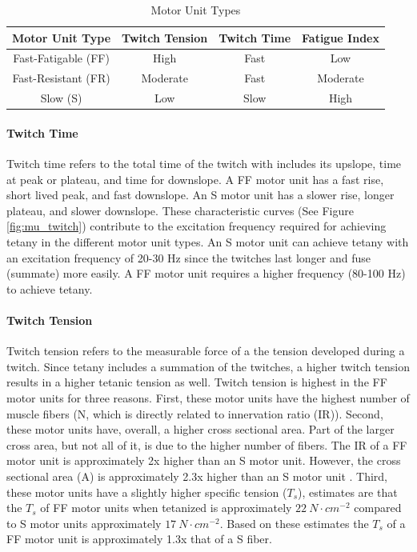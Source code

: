 \begin{table}[h!]
\centering
\begin{tabular}{||c c c c||} 
 \hline
 Motor Unit Type & Twitch Tension & Twitch Time & Fatigue Index \\ [0.5ex] 
 \hline\hline
 Fast-Fatigable (FF)  & High & Fast & Low \\ 
 Fast-Resistant (FR)  & Moderate & Fast & Moderate \\
 Slow (S) &  Low & Slow & High \\ [1ex] 
 \hline
\end{tabular}
\caption{Motor Unit Types}
\label{table:Motor_Unit_Types}
\end{table}

\paragraph{Twitch Time}
Twitch time refers to the total time of the twitch with includes its upslope, time at peak or plateau, and time for downslope. A FF motor unit has a fast rise, short lived peak, and fast downslope. An S motor unit has a slower rise, longer plateau, and slower downslope. These characteristic curves (See Figure \ref{fig:mu_twitch}) contribute to the excitation frequency required for achieving tetany in the different motor unit types. An S motor unit can achieve tetany with an excitation frequency of 20-30 Hz since the twitches last longer and fuse (summate) more easily. A FF motor unit requires a higher frequency (80-100 Hz) to achieve tetany. 

\paragraph{Twitch Tension}
Twitch tension refers to the measurable force of a the tension developed during a twitch. Since tetany includes a summation of the twitches, a higher twitch tension results in a higher tetanic tension as well. Twitch tension is highest in the FF motor units for three reasons. First, these motor units have the highest number of muscle fibers (N, which is directly related to innervation ratio (IR)). Second, these motor units have, overall, a higher cross sectional area. Part of the larger cross area, but not all of it, is due to the higher number of fibers. The IR of a FF motor unit is approximately 2x higher than an S motor unit. However, the cross sectional area (A) is approximately 2.3x higher than an S motor unit \cite{bodine_maximal_1987, buchthal_motor_1980}. Third, these motor units have a slightly higher specific tension ($T_s$), estimates are that the $T_s$ of FF motor units when tetanized is approximately $22 \ N \cdot cm^{-2}$ compared to S motor units approximately $17 \ N \cdot cm^{-2}$. Based on these estimates the $T_s$ of a FF motor unit is approximately 1.3x that of a S fiber. 

